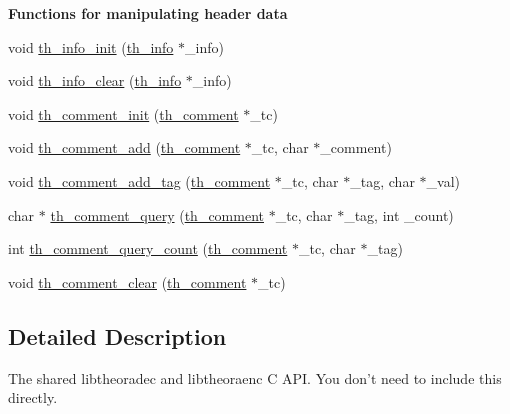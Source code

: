 \begin{Indent}{\bf Functions for manipulating header data}\par
\begin{DoxyCompactItemize}
\item 
void \hyperlink{group__basefuncs_ga430d9c605816a6ca0bdce3a0b965b926}{th\+\_\+info\+\_\+init} (\hyperlink{structth__info}{th\+\_\+info} $\ast$\+\_\+info)
\item 
void \hyperlink{group__basefuncs_gab3d6441ab4a4969859ef5fd78a9e3c1c}{th\+\_\+info\+\_\+clear} (\hyperlink{structth__info}{th\+\_\+info} $\ast$\+\_\+info)
\item 
void \hyperlink{group__basefuncs_ga6c8ab25988e7ea9d7b1e31a54cf58f09}{th\+\_\+comment\+\_\+init} (\hyperlink{structth__comment}{th\+\_\+comment} $\ast$\+\_\+tc)
\item 
void \hyperlink{group__basefuncs_ga19a1f7b8032db957df151a34e5ac9272}{th\+\_\+comment\+\_\+add} (\hyperlink{structth__comment}{th\+\_\+comment} $\ast$\+\_\+tc, char $\ast$\+\_\+comment)
\item 
void \hyperlink{group__basefuncs_ga6c5edc201ca220a30787ca6c1ddcaeaf}{th\+\_\+comment\+\_\+add\+\_\+tag} (\hyperlink{structth__comment}{th\+\_\+comment} $\ast$\+\_\+tc, char $\ast$\+\_\+tag, char $\ast$\+\_\+val)
\item 
char $\ast$ \hyperlink{group__basefuncs_ga33c8b4f57a03217636d704c2ebb211fa}{th\+\_\+comment\+\_\+query} (\hyperlink{structth__comment}{th\+\_\+comment} $\ast$\+\_\+tc, char $\ast$\+\_\+tag, int \+\_\+count)
\item 
int \hyperlink{group__basefuncs_ga81d518dc4426f63ceaedcbe2668679fc}{th\+\_\+comment\+\_\+query\+\_\+count} (\hyperlink{structth__comment}{th\+\_\+comment} $\ast$\+\_\+tc, char $\ast$\+\_\+tag)
\item 
void \hyperlink{group__basefuncs_gae736c1afa514947a3feb223143af95e3}{th\+\_\+comment\+\_\+clear} (\hyperlink{structth__comment}{th\+\_\+comment} $\ast$\+\_\+tc)
\end{DoxyCompactItemize}
\end{Indent}


\subsection{Detailed Description}
The shared {\ttfamily libtheoradec} and {\ttfamily libtheoraenc} C A\+P\+I. You don't need to include this directly. 

